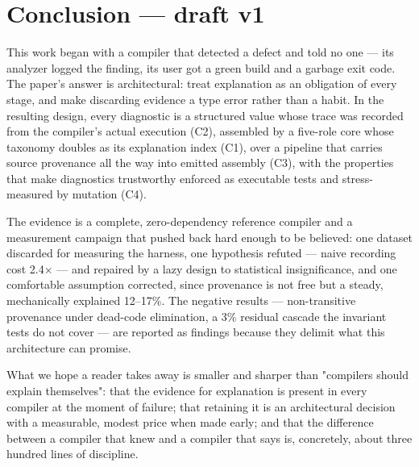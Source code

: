 \section{Conclusion --- draft v1}
\label{sec:conclusion}

This work began with a compiler that detected a defect and told no
one --- its analyzer logged the finding, its user got a green build
and a garbage exit code. The paper's answer is architectural: treat
explanation as an obligation of every stage, and make discarding
evidence a type error rather than a habit. In the resulting design,
every diagnostic is a structured value whose trace was recorded from
the compiler's actual execution (C2), assembled by a five-role core
whose taxonomy doubles as its explanation index (C1), over a
pipeline that carries source provenance all the way into emitted
assembly (C3), with the properties that make diagnostics trustworthy
enforced as executable tests and stress-measured by mutation (C4).

The evidence is a complete, zero-dependency reference compiler and a
measurement campaign that pushed back hard enough to be believed:
one dataset discarded for measuring the harness, one hypothesis
refuted --- naive recording cost 2.4$\times$ --- and repaired by a lazy design
to statistical insignificance, and one comfortable assumption
corrected, since provenance is not free but a steady, mechanically
explained 12--17\%. The negative results --- non-transitive provenance
under dead-code elimination, a 3\% residual cascade the invariant
tests do not cover --- are reported as findings because they delimit
what this architecture can promise.

What we hope a reader takes away is smaller and sharper than
"compilers should explain themselves": that the evidence for
explanation is present in every compiler at the moment of failure;
that retaining it is an architectural decision with a measurable,
modest price when made early; and that the difference between a
compiler that knew and a compiler that says is, concretely, about
three hundred lines of discipline.



